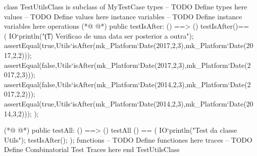 \begin{vdmpp}[breaklines=true]
class TestUtilsClass is subclass of MyTestCase
types
-- TODO Define types here
values
-- TODO Define values here
instance variables
-- TODO Define instance variables here
operations
(*@
\label{testIsAfter:9}
@*)
 public testIsAfter: () ==> ()
 testIsAfter()==
 ( 
    IO`println("\t (1) Verificao de uma data ser posterior a outra");
  assertEqual(true,Utils`isAfter(mk_Platform`Date(2017,2,3),mk_Platform`Date(2017,2,2)));
  assertEqual(false,Utils`isAfter(mk_Platform`Date(2017,2,3),mk_Platform`Date(2017,2,3)));
  assertEqual(false,Utils`isAfter(mk_Platform`Date(2014,2,3),mk_Platform`Date(2017,2,2)));
  assertEqual(true,Utils`isAfter(mk_Platform`Date(2014,2,3),mk_Platform`Date(2014,3,2)));
 );
 
(*@
\label{testAll:19}
@*)
 public testAll: () ==> ()
 testAll () ==
 (
 IO`println("Test da classe Utils");
  testIsAfter();
 );
functions
-- TODO Define functiones here
traces
-- TODO Define Combinatorial Test Traces here
end TestUtilsClass
\end{vdmpp}


